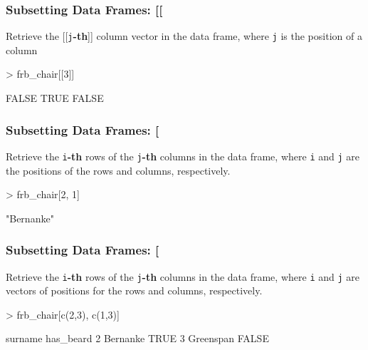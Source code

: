 \documentclass{beamer}
\newcommand{\R}[1]{\texttt{#1}}
\begin{document}
\begin{frame}[fragile]
\frametitle{Subsetting Data Frames: [[}


Retrieve the [[\R{j}\textbf{-th}]] column vector in the data frame, where \R{j} is the position of a column
\begin{Schunk}
\begin{Sinput}
> frb_chair[[3]]
\end{Sinput}
\end{Schunk}
\pause
\begin{Schunk}
\begin{Soutput}
[1] FALSE  TRUE FALSE
\end{Soutput}
\end{Schunk}
\end{frame}



\begin{frame}[fragile]
\frametitle{Subsetting Data Frames: [}

Retrieve the \R{i}\textbf{-th} rows of the \R{j}\textbf{-th} columns in the data frame, where \R{i} and \R{j} are the positions of the rows and columns, respectively.

\begin{Schunk}
\begin{Sinput}
> frb_chair[2, 1]
\end{Sinput}
\end{Schunk}
\pause
\begin{Schunk}
\begin{Soutput}
[1] "Bernanke"
\end{Soutput}
\end{Schunk}
\end{frame}



\begin{frame}[fragile]
\frametitle{Subsetting Data Frames: [}

Retrieve the \R{i}\textbf{-th} rows of the \R{j}\textbf{-th} columns in the data frame, where \R{i} and \R{j} are vectors of positions for the rows and columns, respectively.

\begin{Schunk}
\begin{Sinput}
> frb_chair[c(2,3), c(1,3)]
\end{Sinput}
\end{Schunk}
\pause
\begin{Schunk}
\begin{Soutput}
    surname has_beard
2  Bernanke      TRUE
3 Greenspan     FALSE
\end{Soutput}
\end{Schunk}
\end{frame}
\end{document}
